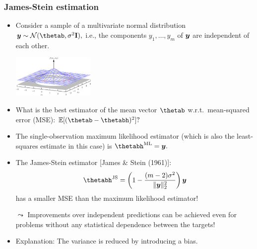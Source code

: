 \begin{frame}
	\frametitle{James-Stein estimation}
%	
	\footnotesize
%	
	\begin{itemize}
%		
		\item Consider a sample of a multivariate normal distribution $\yv \sim \normal(\thetab, \sigma^2\mathbf{I}),$ i.e., the components $y_1,\ldots,y_m$ of $\bm{y}$ are independent of each other.
%		
		\begin{center}
			\includegraphics[width = 4cm]{figure/biva}
		\end{center}
%		
		\item What is the best estimator of the mean vector $\thetab$ w.r.t.\ mean-squared error (MSE): $\mathbb{E}[(\thetab - \thetabh)^2]?$  
%		
		\item The single-observation maximum likelihood estimator (which is also the least-squares estimate in this case) is $\thetabh^{\mathrm{ML}} = \yv.$  
%		
		\item The James-Stein estimator [James \& Stein (1961)]:
		$$
		\thetabh^{\mathrm{JS}} = \left (1 - \frac{(m-2)\sigma^2}{\|\yv\|^2_2} \right )\yv
		$$
		has a smaller MSE than the maximum likelihood estimator!
%		
		\item[$\leadsto$] Improvements over independent predictions can be achieved even for problems without any statistical dependence between the targets!
%
		\item Explanation: The variance is reduced by introducing a bias.
%		
%
	\end{itemize}
	
\end{frame}




